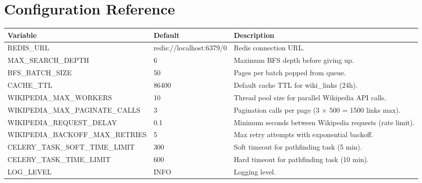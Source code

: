 \documentclass[11pt,a4paper]{article}
\begin{document}
\section{Configuration Reference}

\begin{tabularx}{\textwidth}{@{}>{\ttfamily}l l X@{}}
\toprule
\normalfont\textbf{Variable} & \textbf{Default} & \textbf{Description} \\
\midrule
REDIS\_URL & redis://localhost:6379/0 & Redis connection URL. \\
MAX\_SEARCH\_DEPTH & 6 & Maximum BFS depth before giving up. \\
BFS\_BATCH\_SIZE & 50 & Pages per batch popped from queue. \\
CACHE\_TTL & 86400 & Default cache TTL for wiki\_links (24h). \\
WIKIPEDIA\_MAX\_WORKERS & 10 & Thread pool size for parallel Wikipedia API calls. \\
WIKIPEDIA\_MAX\_PAGINATE\_CALLS & 3 & Pagination calls per page (3 $\times$ 500 = 1500 links max). \\
WIKIPEDIA\_REQUEST\_DELAY & 0.1 & Minimum seconds between Wikipedia requests (rate limit). \\
WIKIPEDIA\_BACKOFF\_MAX\_RETRIES & 5 & Max retry attempts with exponential backoff. \\
CELERY\_TASK\_SOFT\_TIME\_LIMIT & 300 & Soft timeout for pathfinding task (5 min). \\
CELERY\_TASK\_TIME\_LIMIT & 600 & Hard timeout for pathfinding task (10 min). \\
LOG\_LEVEL & INFO & Logging level. \\
\bottomrule
\end{tabularx}

\end{document}
